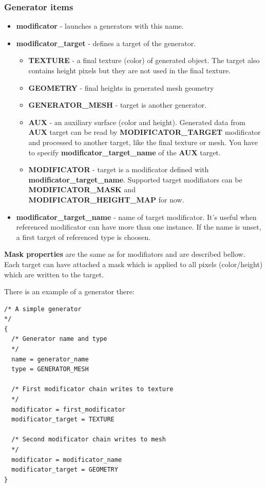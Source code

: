 \documentclass[9pt]{article}
\begin{document}
\subsubsection*{Generator items}
\begin{itemize}
\item{\bf modificator} - launches a generators with this name.
\item{\bf modificator\_target} - defines a target of the generator.
\begin{itemize}
\item{\bf TEXTURE} - a final texture (color) of generated object. The target also contains height pixels
but they are not used in the final texture.
\item{\bf GEOMETRY} - final heights in generated mesh geometry
\item{\bf GENERATOR\_MESH} - target is another generator.
\item{\bf AUX} - an auxiliary surface (color and height). Generated data from {\bf AUX} target 
can be read by {\bf MODIFICATOR\_TARGET} modificator and processed to another target, like the final texture or mesh. 
You have to specify {\bf modificator\_target\_name} of the {\bf AUX} target.
\item{\bf MODIFICATOR} - target is a modificator defined with {\bf modificator\_target\_name}. 
Supported target modifiators can be {\bf MODIFICATOR\_MASK} and 
{\bf MODIFICATOR\_HEIGHT\_MAP} for now.
\end{itemize}
\item{\bf modificator\_target\_name} - name of target modificator. It's useful
when referenced modificator can have more than one instance. If the name is unset,
a first target of referenced type is choosen.
\end{itemize}

{\bf Mask properties} are the same as for modifiators and are described bellow. Each
target can have attached a mask which is applied to all pixels (color/height) which
are written to the target.

There is an example of a generator there:

\begin{verbatim}
/* A simple generator
*/
{
  /* Generator name and type
  */
  name = generator_name
  type = GENERATOR_MESH
  
  /* First modificator chain writes to texture
  */
  modificator = first_modificator
  modificator_target = TEXTURE
  
  /* Second modificator chain writes to mesh
  */
  modificator = modificator_name  
  modificator_target = GEOMETRY
}
\end{verbatim}
\end{document}
